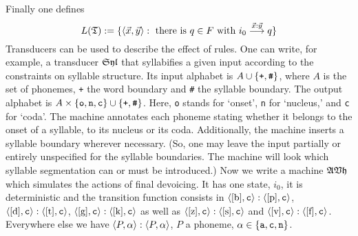Finally one defines
\begin{equation}
L(\mathfrak{T}) := \{\langle \vec{x}, \vec{y}\rangle : \mbox{ there is }
    q \in F \mbox{ with }
    i_0 \stackrel{\vec{x}: \vec{y}}{\longrightarrow} q\}
\end{equation}
Transducers can be used to describe the effect of rules.
One can write, for example, a transducer $\mathfrak{Syl}$ that
syllabifies a given input according to the constraints on
syllable structure. Its input alphabet is $A \cup \{
\mbox{\tt +}, \mbox{\tt \#}\}$, where $A$ is the set of 
phonemes, {\tt +} the word boundary and {\tt \#} the syllable 
boundary. The output alphabet is $A \times \{\mbox{\tt o}, 
\mbox{\tt n}, \mbox{\tt c}\} \cup \{\mbox{\tt +}, \mbox{\tt \#}\}$. 
Here, {\tt o} stands for `onset', {\tt n} for `nucleus,' and 
{\tt c} for `coda'. The machine annotates each phoneme stating 
whether it belongs to the onset of a syllable, to its nucleus or 
its coda. Additionally, the machine inserts a syllable boundary 
wherever necessary. (So, one may leave the input partially or 
entirely unspecified for the 
syllable boundaries. The machine will look which syllable segmentation
can or must be introduced.) Now we write a machine $\mathfrak{AVh}$
which simulates the actions of final devoicing. It has one
state, $i_0$, it is deterministic and the transition function
consists in
$\langle \mbox{[b]}, \mbox{\tt c}\rangle : \langle \mbox{[p]}, \mbox{\tt c}\rangle$,
$\langle \mbox{[d]}, \mbox{\tt c}\rangle : \langle \mbox{[t]}, \mbox{\tt c}\rangle$,
$\langle \mbox{[g]}, \mbox{\tt c}\rangle : \langle \mbox{[k]}, \mbox{\tt c}\rangle$ as
well as
$\langle \mbox{[z]}, \mbox{\tt c}\rangle : \langle \mbox{[s]}, \mbox{\tt c}\rangle$ and
$\langle \mbox{[v]}, \mbox{\tt c}\rangle : \langle \mbox{[f]}, \mbox{\tt c}\rangle$.
Everywhere else we have
$\langle P, \alpha\rangle : \langle P, \alpha\rangle$, $P$ a phoneme,
$\alpha \in \{\mbox{\tt a},\mbox{\tt c},\mbox{\tt n}\}$.

